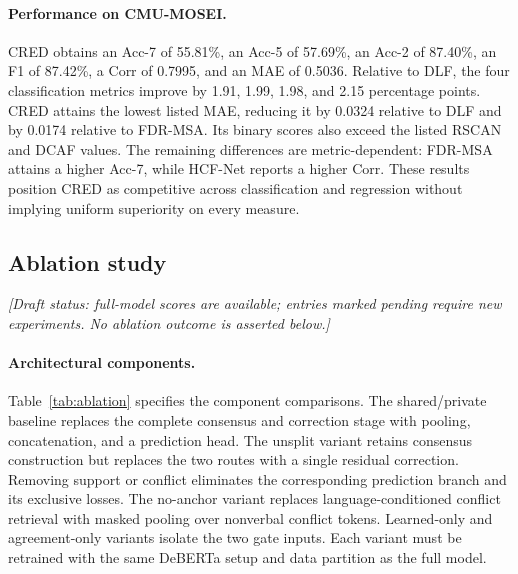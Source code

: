 \documentclass[review,12pt]{elsarticle}
\begin{document}
\paragraph{Performance on CMU-MOSEI.}
CRED obtains an Acc-7 of 55.81\%, an Acc-5 of 57.69\%, an Acc-2 of 87.40\%, an F1 of 87.42\%, a Corr of 0.7995, and an MAE of 0.5036. Relative to DLF, the four classification metrics improve by 1.91, 1.99, 1.98, and 2.15 percentage points. CRED attains the lowest listed MAE, reducing it by 0.0324 relative to DLF and by 0.0174 relative to FDR-MSA. Its binary scores also exceed the listed RSCAN and DCAF values. The remaining differences are metric-dependent: FDR-MSA attains a higher Acc-7, while HCF-Net reports a higher Corr. These results position CRED as competitive across classification and regression without implying uniform superiority on every measure.

\subsection{Ablation study}
\noindent\emph{[Draft status: full-model scores are available; entries marked pending require new experiments. No ablation outcome is asserted below.]}

\paragraph{Architectural components.}
Table~\ref{tab:ablation} specifies the component comparisons. The shared/private baseline replaces the complete consensus and correction stage with pooling, concatenation, and a prediction head. The unsplit variant retains consensus construction but replaces the two routes with a single residual correction. Removing support or conflict eliminates the corresponding prediction branch and its exclusive losses. The no-anchor variant replaces language-conditioned conflict retrieval with masked pooling over nonverbal conflict tokens. Learned-only and agreement-only variants isolate the two gate inputs. Each variant must be retrained with the same DeBERTa setup and data partition as the full model.
\end{document}
